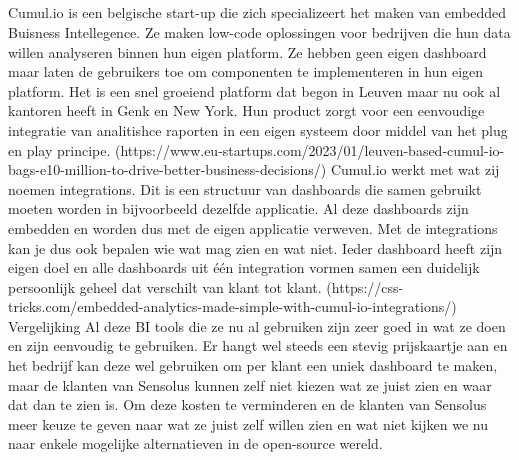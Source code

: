 \subsection{}%
\label{sec:cumul.IO}
Cumul.io is een belgische start-up die zich specializeert het maken van embedded Buisness Intellegence. Ze maken low-code oplossingen voor bedrijven die hun data willen analyseren binnen hun eigen platform. Ze hebben geen eigen dashboard maar laten de gebruikers toe om componenten te implementeren in hun eigen platform. Het is een snel groeiend platform dat begon in Leuven maar nu ook al kantoren heeft in Genk en New York. Hun product zorgt voor een eenvoudige integratie van analitishce raporten in een eigen systeem door middel van het plug en play principe. 
(https://www.eu-startups.com/2023/01/leuven-based-cumul-io-bags-e10-million-to-drive-better-business-decisions/)
Cumul.io werkt met wat zij noemen integrations. Dit is een structuur van dashboards die samen gebruikt moeten worden in bijvoorbeeld dezelfde applicatie. Al deze dashboards zijn embedden en worden dus met de eigen applicatie verweven. Met de integrations kan je dus ook bepalen wie wat mag zien en wat niet. Ieder dashboard heeft zijn eigen doel en alle dashboards uit één integration vormen samen een duidelijk persoonlijk geheel dat verschilt van klant tot klant.
(https://css-tricks.com/embedded-analytics-made-simple-with-cumul-io-integrations/) 
Vergelijking
Al deze BI tools die ze nu al gebruiken zijn zeer goed in wat ze doen en zijn eenvoudig te gebruiken. Er hangt wel steeds een stevig prijskaartje aan en het bedrijf kan deze wel gebruiken om per klant een uniek dashboard te maken, maar de klanten van Sensolus kunnen zelf niet kiezen wat ze juist zien en waar dat dan te zien is.
Om deze kosten te verminderen en de klanten van Sensolus meer keuze te geven naar wat ze juist zelf willen zien en wat niet kijken we nu naar enkele mogelijke alternatieven in de open-source wereld.

\section{}%
\label{sec:opensourceAlternatieven}
